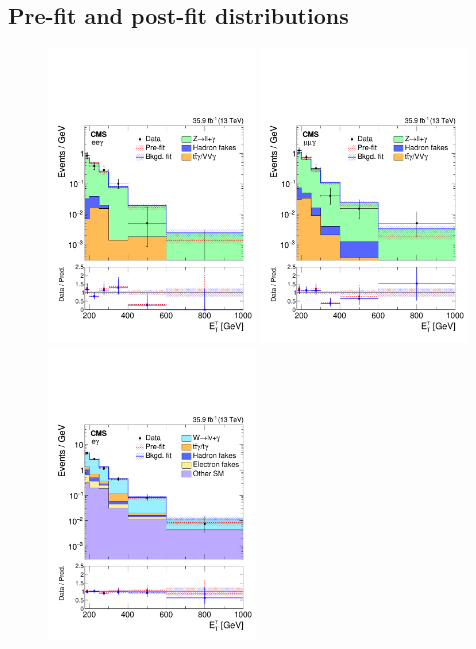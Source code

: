 \subsection{Pre-fit and post-fit distributions}
\label{sec:distributions}

\begin{figure}[htbp]
  \centering
    \includegraphics[width=0.49\textwidth]{Analysis/Figures/bonly_diel.pdf}
    \includegraphics[width=0.49\textwidth]{Analysis/Figures/bonly_dimu.pdf}
    \includegraphics[width=0.49\textwidth]{Analysis/Figures/bonly_monoel.pdf}

\end{figure}
